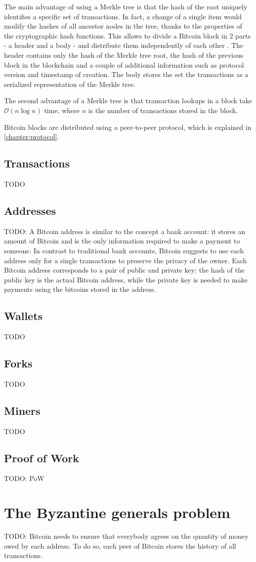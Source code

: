 The main advantage of using a Merkle tree is that the hash of the root uniquely identifies a specific set of transactions.
In fact, a change of a single item would modify the hashes of all ancestor nodes in the tree, thanks to the properties of the cryptographic hash functions.
This allows to divide a Bitcoin block in \num{2} parts - a header and a body - and distribute them independently of each other \cite{bitcoin_reference}.
The header contains only the hash of the Merkle tree root, the hash of the previous block in the blockchain and a couple of additional information such as protocol version and timestamp of creation.
The body stores the set the transactions as a serialized representation of the Merkle tree.

The second advantage of a Merkle tree is that transaction lookups in a block take $\mathcal{O}(n\log n)$ time, where $n$ is the number of transactions stored in the block.

Bitcoin blocks are distributed using a peer-to-peer protocol, which is explained in \cref{chapter:protocol}.


\subsection{Transactions}
TODO


\subsection{Addresses}
TODO: A Bitcoin address is similar to the concept a bank account:
it stores an amount of Bitcoin and is the only information required to make a payment to someone.
In contrast to traditional bank accounts, Bitcoin suggests to use each address only for a single transactions to preserve the privacy of the owner.
Each Bitcoin address corresponds to a pair of public and private key: the hash of the public key is the actual Bitcoin address, while the private key is needed to make payments using the bitcoins stored in the address.

\subsection{Wallets}
TODO

\subsection{Forks}
TODO

\subsection{Miners}
TODO

\subsection{Proof of Work}
TODO: PoW \cite{pow_2002}


\section{The Byzantine generals problem}
TODO: Bitcoin needs to ensure that everybody agrees on the quantity of money owed by each address.
To do so, each peer of Bitcoin stores the history of all transactions.
\cite{byzantin_generals_1982}
